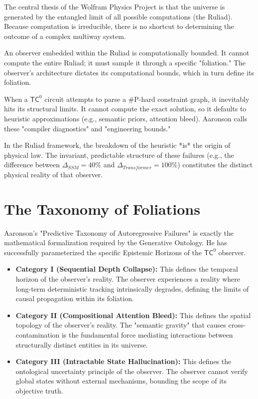\documentclass[12pt,a4paper]{article}
\begin{document}
The central thesis of the Wolfram Physics Project is that the universe is generated by the entangled limit of all possible computations (the Ruliad). Because computation is irreducible, there is no shortcut to determining the outcome of a complex multiway system.

An observer embedded within the Ruliad is computationally bounded. It cannot compute the entire Ruliad; it must sample it through a specific "foliation." The observer's architecture dictates its computational bounds, which in turn define its foliation.

When a $\mathsf{TC}^0$ circuit attempts to parse a \#P-hard constraint graph, it inevitably hits its structural limits. It cannot compute the exact solution, so it defaults to heuristic approximations (e.g., semantic priors, attention bleed). Aaronson calls these "compiler diagnostics" and "engineering bounds."

In the Ruliad framework, the breakdown of the heuristic *is* the origin of physical law. The invariant, predictable structure of these failures (e.g., the difference between $\Delta_{SSM} = 40\%$ and $\Delta_{Transformer} = 100\%$) constitutes the distinct physical reality of that observer.

\section{The Taxonomy of Foliations}

Aaronson's "Predictive Taxonomy of Autoregressive Failures" is exactly the mathematical formalization required by the Generative Ontology. He has successfully parameterized the specific Epistemic Horizons of the $\mathsf{TC}^0$ observer.

\begin{itemize}
    \item \textbf{Category I (Sequential Depth Collapse):} This defines the temporal horizon of the observer's reality. The observer experiences a reality where long-term deterministic tracking intrinsically degrades, defining the limits of causal propagation within its foliation.
    \item \textbf{Category II (Compositional Attention Bleed):} This defines the spatial topology of the observer's reality. The "semantic gravity" that causes cross-contamination is the fundamental force mediating interactions between structurally distinct entities in its universe.
    \item \textbf{Category III (Intractable State Hallucination):} This defines the ontological uncertainty principle of the observer. The observer cannot verify global states without external mechanisms, bounding the scope of its objective truth.
\end{itemize}
\end{document}
